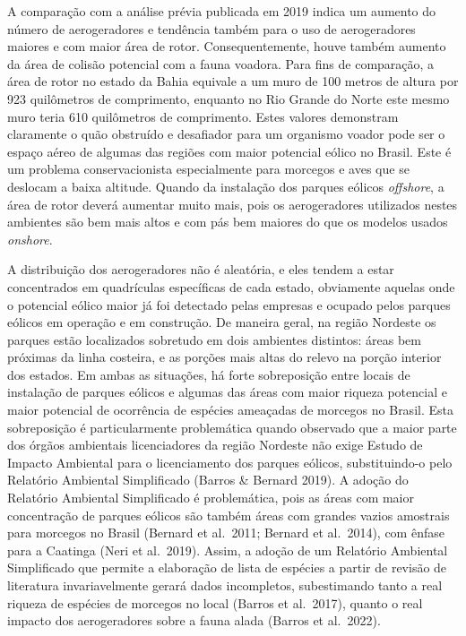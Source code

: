 \documentclass[
  oneside]{scrbook}
\begin{document}
A comparação com a análise prévia publicada em 2019 indica um aumento do número de aerogeradores e tendência também para o uso de aerogeradores maiores e com maior área de rotor. Consequentemente, houve também aumento da área de colisão potencial com a fauna voadora. Para fins de comparação, a área de rotor no estado da Bahia equivale a um muro de 100 metros de altura por 923 quilômetros de comprimento, enquanto no Rio Grande do Norte este mesmo muro teria 610 quilômetros de comprimento. Estes valores demonstram claramente o quão obstruído e desafiador para um organismo voador pode ser o espaço aéreo de algumas das regiões com maior potencial eólico no Brasil. Este é um problema conservacionista especialmente para morcegos e aves que se deslocam a baixa altitude. Quando da instalação dos parques eólicos \emph{offshore}, a área de rotor deverá aumentar muito mais, pois os aerogeradores utilizados nestes ambientes são bem mais altos e com pás bem maiores do que os modelos usados \emph{onshore}.

A distribuição dos aerogeradores não é aleatória, e eles tendem a estar concentrados em quadrículas específicas de cada estado, obviamente aquelas onde o potencial eólico maior já foi detectado pelas empresas e ocupado pelos parques eólicos em operação e em construção. De maneira geral, na região Nordeste os parques estão localizados sobretudo em dois ambientes distintos: áreas bem próximas da linha costeira, e as porções mais altas do relevo na porção interior dos estados. Em ambas as situações, há forte sobreposição entre locais de instalação de parques eólicos e algumas das áreas com maior riqueza potencial e maior potencial de ocorrência de espécies ameaçadas de morcegos no Brasil. Esta sobreposição é particularmente problemática quando observado que a maior parte dos órgãos ambientais licenciadores da região Nordeste não exige Estudo de Impacto Ambiental para o licenciamento dos parques eólicos, substituindo-o pelo Relatório Ambiental Simplificado (Barros \& Bernard 2019). A adoção do Relatório Ambiental Simplificado é problemática, pois as áreas com maior concentração de parques eólicos são também áreas com grandes vazios amostrais para morcegos no Brasil (Bernard et al.~2011; Bernard et al.~2014), com ênfase para a Caatinga (Neri et al.~2019). Assim, a adoção de um Relatório Ambiental Simplificado que permite a elaboração de lista de espécies a partir de revisão de literatura invariavelmente gerará dados incompletos, subestimando tanto a real riqueza de espécies de morcegos no local (Barros et al.~2017), quanto o real impacto dos aerogeradores sobre a fauna alada (Barros et al.~2022).
\end{document}

